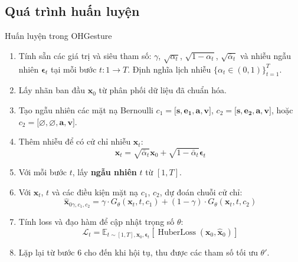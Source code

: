 \subsection{Quá trình huấn luyện}


\begin{algorithm}[H]
	\caption{Huấn luyện trong OHGesture}
	\label{alg:trainingohgesture}
	\setlength{\baselineskip}{10pt}
	\begin{enumerate}
		\item Tính sẵn các giá trị và siêu tham số: $\gamma$, $\sqrt{\alpha_t}$, $\sqrt{1 - \alpha_t}$, $\sqrt{\bar{\alpha}_t}$ và nhiễu ngẫu nhiên $\boldsymbol{\epsilon}_t$ tại mỗi bước $t: 1 \rightarrow T$. Định nghĩa lịch nhiễu $\{\alpha_t \in (0, 1)\}_{t=1}^T$.
		
		\item Lấy nhãn ban đầu $\mathbf{x}_0$ từ phân phối dữ liệu đã chuẩn hóa.
		
		\item Tạo ngẫu nhiên các mặt nạ Bernoulli $c_{1} = \big[ \mathbf{s}, \mathbf{e_1}, \mathbf{a}, \mathbf{v} \big]$, $c_{2} = \big[ \mathbf{s}, \mathbf{e_2}, \mathbf{a}, \mathbf{v} \big]$, hoặc $c_{2} = \big[ \varnothing, \varnothing, \mathbf{a}, \mathbf{v} \big]$.
		
		\item Thêm nhiễu để có cử chỉ nhiễu $\mathbf{x}_t$:
		\[
		\mathbf{x}_t = \sqrt{\bar{\alpha}_t} \mathbf{x}_0 + \sqrt{1 - \bar{\alpha}_t} \boldsymbol{\epsilon}_t
		\]
		
		\item Với mỗi bước $t$, lấy \textbf{ngẫu nhiên} $t$ từ $[1, T]$.
		
		\item Với $\mathbf{x}_t$, $t$ và các điều kiện mặt nạ $c_1$, $c_2$, dự đoán chuỗi cử chỉ:
		\[
		\hat{\mathbf{x}}_{0 \gamma, c_{1}, c_{2}} = \gamma \cdot G_{\theta} \left(\mathbf{x}_{t}, t, c_{1}\right) + (1 - \gamma) \cdot G_{\theta} \left(\mathbf{x}_{t}, t, c_{2}\right)
		\]
		
		\item Tính loss và đạo hàm để cập nhật trọng số $\theta$:
		\[
		\mathcal{L}_t = \mathbb{E}_{t \sim [1, T], \mathbf{x}_0, \boldsymbol{\epsilon}_t} \left[ \operatorname{HuberLoss}(\mathbf{x}_0, \hat{\mathbf{x}}_0 ) \right]
		\]
		
		\item Lặp lại từ bước 6 cho đến khi hội tụ, thu được các tham số tối ưu $\theta'$.
	\end{enumerate}
\end{algorithm}


